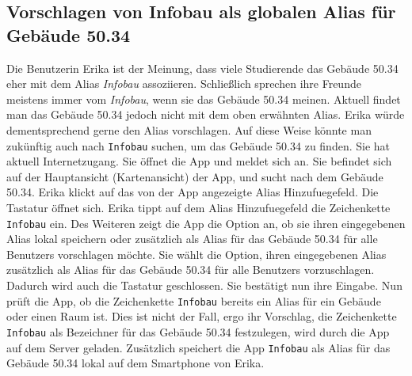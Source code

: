\subsection{Vorschlagen von \dq{}Infobau\dq{} als globalen Alias für Gebäude 50.34}

Die \Gls{Benutzer}in Erika ist der Meinung, dass viele Studierende das Gebäude 50.34 eher mit dem \Gls{Alias} \textit{Infobau} assoziieren.
Schließlich sprechen ihre Freunde meistens immer vom \textit{Infobau}, wenn sie das Gebäude 50.34 meinen.
Aktuell findet man das Gebäude 50.34 jedoch nicht mit dem oben erwähnten \Gls{Alias}.
Erika würde dementsprechend gerne den \Gls{Alias} vorschlagen.
Auf diese Weise könnte man zukünftig auch nach \texttt{Infobau} suchen, um das Gebäude 50.34 zu finden.
Sie hat aktuell Internetzugang. 
Sie öffnet die App und meldet sich an. 
Sie befindet sich auf der Hauptansicht (\Gls{Kartenansicht}) der App, und sucht nach dem Gebäude 50.34.
Erika klickt auf das von der App angezeigte \Gls{Alias} \Gls{Hinzufuegefeld}. 
Die Tastatur öffnet sich.
Erika tippt auf dem \Gls{Alias} \Gls{Hinzufuegefeld} die \Gls{Zeichenkette} \texttt{Infobau} ein.
Des Weiteren zeigt die App die Option an, ob sie ihren eingegebenen \Gls{Alias} \gls{lokal} speichern oder zusätzlich als \Gls{Alias} für das Gebäude 50.34 für alle \Glspl{Benutzer} vorschlagen möchte.
Sie wählt die Option, ihren eingegebenen \Gls{Alias} zusätzlich als \Gls{Alias} für das Gebäude 50.34 für alle \Glspl{Benutzer} vorzuschlagen. 
Dadurch wird auch die Tastatur geschlossen. 
Sie bestätigt nun ihre Eingabe. 
Nun prüft die App, ob die \Gls{Zeichenkette} \texttt{Infobau} bereits ein \Gls{Alias} für ein Gebäude oder einen Raum ist. 
Dies ist nicht der Fall, ergo ihr Vorschlag, die \Gls{Zeichenkette} \texttt{Infobau} als Bezeichner für das Gebäude 50.34 festzulegen, wird durch die App auf dem \Gls{Server} geladen. 
Zusätzlich speichert die App \texttt{Infobau} als \Gls{Alias} für das Gebäude 50.34 \gls{lokal} auf dem Smartphone von Erika.
